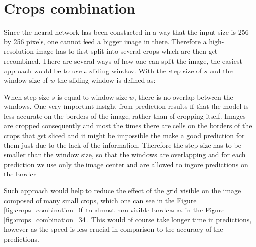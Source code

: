\section{Crops combination}
Since the neural network has been constucted in a way that the input size is 256 by 256 pixels, one cannot feed a bigger image in there. Therefore a high-resolution image has to first split into several crops which are then get recombined. There are several ways of how one can split the image, the easiest approach would be to use a sliding window. With the step size of $s$ and the window size of $w$ the sliding window is defined as: 

When step size $s$ is equal to window size $w$, there is no overlap between the windows. One very important insight from prediction results if that the model is less accurate on the borders of the image, rather than of cropping itself. Images are cropped consequently and most the times there are cells on the borders of the crops that get sliced and it might be impossible the make a good prediction for them just due to the lack of the information. Therefore the step size has to be smaller than the window size, so that the windows are overlapping and for each prediction we use only the image center and are allowed to ingore predictions on the border. 

Such approach would help to reduce the effect of the grid visible on the image composed of many small crops, which one can see in the Figure \ref{fig:crops_combination_0} to almost non-visible borders as in the Figure \ref{fig:crops_combination_34}. This would of course take longer time in predictions, however as the speed is less crucial in comparison to the accuracy of the predictions.

